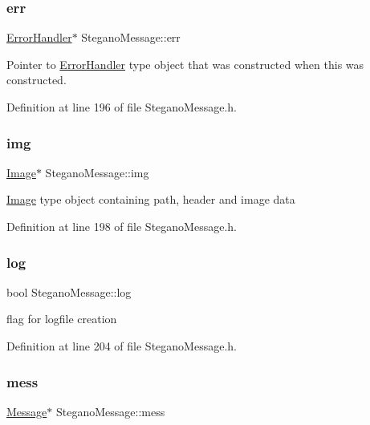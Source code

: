 \subsubsection{\texorpdfstring{err}{err}}
{\footnotesize\ttfamily \mbox{\hyperlink{classErrorHandler}{Error\+Handler}}$\ast$ Stegano\+Message\+::err\hspace{0.3cm}{\ttfamily [private]}}

Pointer to \mbox{\hyperlink{classErrorHandler}{Error\+Handler}} type object that was constructed when this was constructed. 

Definition at line 196 of file Stegano\+Message.\+h.

\mbox{\label{classSteganoMessage_acd7dba217d5df515d93ddf814734ecf4}} 
\subsubsection{\texorpdfstring{img}{img}}
{\footnotesize\ttfamily \mbox{\hyperlink{classImage}{Image}}$\ast$ Stegano\+Message\+::img\hspace{0.3cm}{\ttfamily [private]}}

\mbox{\hyperlink{classImage}{Image}} type object containing path, header and image data 

Definition at line 198 of file Stegano\+Message.\+h.

\mbox{\label{classSteganoMessage_a687c455d3f09eb5349e0358cb07aa21c}} 
\subsubsection{\texorpdfstring{log}{log}}
{\footnotesize\ttfamily bool Stegano\+Message\+::log\hspace{0.3cm}{\ttfamily [private]}}

flag for logfile creation 

Definition at line 204 of file Stegano\+Message.\+h.

\mbox{\label{classSteganoMessage_a64f70bbacb0662cebe764316658da35d}} 
\subsubsection{\texorpdfstring{mess}{mess}}
{\footnotesize\ttfamily \mbox{\hyperlink{classMessage}{Message}}$\ast$ Stegano\+Message\+::mess\hspace{0.3cm}{\ttfamily [private]}}

